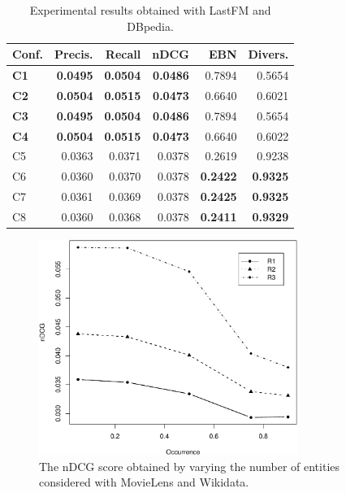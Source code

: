 \begin{table}
\centering
\begin{tabular}{@{}lrrrrr@{}}
\toprule
Conf.       & Precis.         & Recall          & nDCG            & EBN             & Divers. \\ \midrule
\textbf{C1} & \textbf{0.0495} & \textbf{0.0504} & \textbf{0.0486} & 0.7894          & 0.5654  \\
\textbf{C2} & \textbf{0.0504} & \textbf{0.0515} & \textbf{0.0473} & 0.6640          & 0.6021  \\
\textbf{C3} & \textbf{0.0495} & \textbf{0.0504} & \textbf{0.0486} & 0.7894          & 0.5654  \\
\textbf{C4} & \textbf{0.0504} & \textbf{0.0515} & \textbf{0.0473} & 0.6640          & 0.6022  \\
C5          & 0.0363          & 0.0371          & 0.0378          & 0.2619          & 0.9238  \\
C6          & 0.0360          & 0.0370          & 0.0378          & \textbf{0.2422} & \textbf{0.9325}  \\
C7          & 0.0361          & 0.0369          & 0.0378          & \textbf{0.2425} & \textbf{0.9325}  \\
C8          & 0.0360          & 0.0368          & 0.0378          & \textbf{0.2411} & \textbf{0.9329} \\ \bottomrule
\end{tabular}
\caption[Experimental results with LastFM and DBpedia]{Experimental results obtained with LastFM and DBpedia.}
\label{srr:tab:ex1-fm}
\end{table}

\begin{figure}
\centering
\includegraphics[width=0.75\textwidth]{lineplot}
\caption[nDCG with MovieLens and Wikidata]{The nDCG score obtained by varying the number of entities considered with MovieLens and Wikidata.}
\label{srr:fig:lineplot}
\end{figure}

